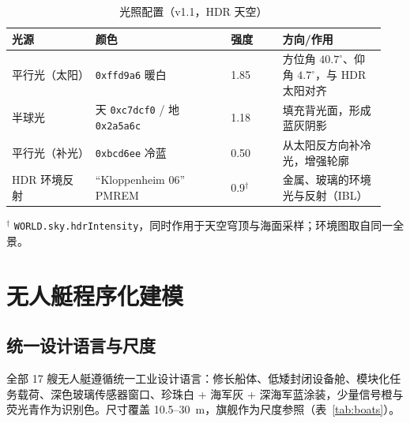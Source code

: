 \documentclass[UTF8, a4paper, 11pt]{ctexart}
\begin{document}
\begin{table}[H]
\centering
\caption{光照配置（v1.1，HDR 天空）}
\label{tab:lights}
\small
\begin{tabular}{@{}p{0.21\linewidth}p{0.34\linewidth}p{0.13\linewidth}p{0.26\linewidth}@{}}
\toprule
\textbf{光源} & \textbf{颜色} & \textbf{强度} & \textbf{方向/作用} \\
\midrule
平行光（太阳） & \texttt{0xffd9a6} 暖白 & 1.85 & 方位角 $40.7^\circ$、仰角 $4.7^\circ$，与 HDR 太阳对齐 \\
半球光 & 天 \texttt{0xc7dcf0} / 地 \texttt{0x2a5a6c} & 1.18 & 填充背光面，形成蓝灰阴影 \\
平行光（补光） & \texttt{0xbcd6ee} 冷蓝 & 0.50 & 从太阳反方向补冷光，增强轮廓 \\
HDR 环境反射 & “Kloppenheim 06” PMREM & 0.9$^{\dagger}$ & 金属、玻璃的环境光与反射（IBL） \\
\bottomrule
\end{tabular}
\vspace{0.3em}
{\footnotesize $^{\dagger}$ \texttt{WORLD.sky.hdrIntensity}，同时作用于天空穹顶与海面采样；环境图取自同一全景。}
\end{table}

\section{无人艇程序化建模}

\subsection{统一设计语言与尺度}

全部 17 艘无人艇遵循统一工业设计语言：修长船体、低矮封闭设备舱、模块化任务载荷、深色玻璃传感器窗口、珍珠白 + 海军灰 + 深海军蓝涂装，少量信号橙与荧光青作为识别色。尺寸覆盖 10.5--30~m，旗舰作为尺度参照（表~\ref{tab:boats}）。
\end{document}
